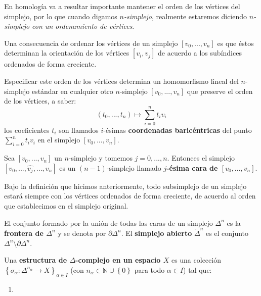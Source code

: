 \documentclass[12pt]{report}
\newcounter{it}
\theoremstyle{largebreak}
\newcommand\cf[3]{\ensuremath{#1:#2\rightarrow#3}}
\begin{document}
    En homología va a resultar importante mantener el orden de los vértices del simplejo, por lo que cuando digamos \textit{$n$-simplejo}, realmente estaremos diciendo \textit{$n$-simplejo con un ordenamiento de vértices}.

    Una consecuencia de ordenar los vértices de un simplejo $[v_0,...,v_n]$ es que éstos determinan la orientación de los vértices $[v_i,v_j]$ de acuerdo a los subíndices ordenados de forma creciente.

    Especificar este orden de los vértices determina un homomorfismo lineal del $n$-simplejo estándar en cualquier otro $n$-simplejo $[v_0,...,v_n]$ que preserve el orden de los vértices, a saber:
    \begin{equation*}
        (t_0,...,t_n)\mapsto \sum_{ i=0}^n t_iv_i
    \end{equation*}
    los coeficientes $t_i$ son llamados $i$-ésimas \textbf{coordenadas baricéntricas} del punto $\sum_{ i=0}^n t_iv_i$ en el simplejo $[v_0,...,v_n]$.

    \begin{mydef}
        Sea $[v_0,...,v_n]$ un $n$-simplejo y tomemos $j=0,...,n$. Entonces el simplejo $[v_0,...,\hat{v_j},...,v_n]$ es un $(n-1)$-simplejo llamado \textbf{$j$-ésima cara de $[v_0,...,v_n]$}.
    \end{mydef}

    \begin{obs}
        Bajo la definición que hicimos anteriormente, todo subsimplejo de un simplejo estará siempre con los vértices ordenados de forma creciente, de acuerdo al orden que establecimos en el simplejo original. 
    \end{obs}

    \begin{mydef}
        El conjunto formado por la unión de todas las caras de un simplejo $\Delta^n$ es la \textbf{frontera de $\Delta^n$} y se denota por $\partial\Delta^n$. El \textbf{simplejo abierto} $\mathring{\Delta}^n$ es el conjunto $\Delta^n\setminus\partial\Delta^n$.
    \end{mydef}

    \begin{mydef}
        Una \textbf{estructura de $\Delta$-complejo en un espacio $X$} es una colección $\left\{\cf{\sigma_\alpha}{\Delta^{ n_\alpha}}{X} \right\}_{\alpha\in I}$ (con $n_\alpha\in\mathbb{N}\cup\left\{0 \right\}$ para todo $\alpha\in I$) tal que:
        \begin{enumerate}[label = \textit{(\arabic*)}]
            \item 
        \end{enumerate}
    \end{mydef}
\end{document}
